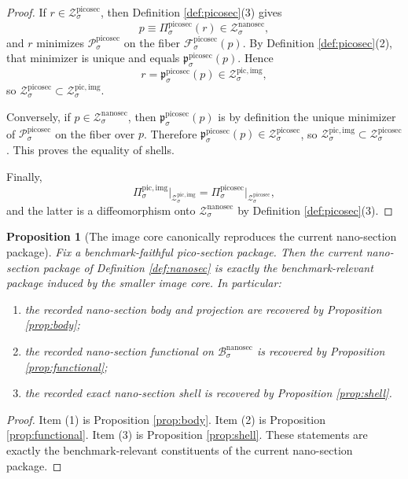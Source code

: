 \documentclass[11pt]{article}
\newcommand{\NanoSectionBody}[1]{\mathcal B_{#1}^{\mathrm{nanosec}}}
\newcommand{\NanoSectionShell}[1]{\mathcal Z_{#1}^{\mathrm{nanosec}}}
\newcommand{\PicoSectionProj}[1]{\Pi_{#1}^{\mathrm{picosec}}}
\newcommand{\PicoSectionFiber}[2]{\mathcal F_{#1}^{\mathrm{picosec}}(#2)}
\newcommand{\PicoSectionNanoMin}[1]{\mathfrak p_{#1}^{\mathrm{picosec}}}
\newcommand{\PicoSectionFunctional}[1]{\mathscr P_{#1}^{\mathrm{picosec}}}
\newcommand{\PicoSectionShell}[1]{\mathcal Z_{#1}^{\mathrm{picosec}}}
\newcommand{\PicoImgProj}[1]{\Pi_{#1}^{\mathrm{pic,img}}}
\newcommand{\PicoImgShell}[1]{\mathcal Z_{#1}^{\mathrm{pic,img}}}
\newtheorem{proposition}{Proposition}
\begin{document}
\begin{proof}
If \(r\in\PicoSectionShell{\sigma}\), then Definition \ref{def:picosec}(3) gives
\[
p\equiv \PicoSectionProj{\sigma}(r)\in\NanoSectionShell{\sigma},
\]
and \(r\) minimizes \(\PicoSectionFunctional{\sigma}\) on the fiber \(\PicoSectionFiber{\sigma}{p}\). By Definition \ref{def:picosec}(2), that minimizer is unique and equals \(\PicoSectionNanoMin{\sigma}(p)\). Hence
\[
r=\PicoSectionNanoMin{\sigma}(p)\in\PicoImgShell{\sigma},
\]
so \(\PicoSectionShell{\sigma}\subset\PicoImgShell{\sigma}\).

Conversely, if \(p\in\NanoSectionShell{\sigma}\), then \(\PicoSectionNanoMin{\sigma}(p)\) is by definition the unique minimizer of \(\PicoSectionFunctional{\sigma}\) on the fiber over \(p\). Therefore \(\PicoSectionNanoMin{\sigma}(p)\in\PicoSectionShell{\sigma}\), so \(\PicoImgShell{\sigma}\subset\PicoSectionShell{\sigma}\). This proves the equality of shells.

Finally,
\[
\PicoImgProj{\sigma}\big|_{\PicoImgShell{\sigma}}
=
\PicoSectionProj{\sigma}\big|_{\PicoSectionShell{\sigma}},
\]
and the latter is a diffeomorphism onto \(\NanoSectionShell{\sigma}\) by Definition \ref{def:picosec}(3).
\end{proof}

\begin{proposition}[The image core canonically reproduces the current nano-section package]
\label{prop:package}
Fix a benchmark-faithful pico-section package. Then the current nano-section package of Definition \ref{def:nanosec} is exactly the benchmark-relevant package induced by the smaller image core. In particular:
\begin{enumerate}
    \item the recorded nano-section body and projection are recovered by Proposition \ref{prop:body};
    \item the recorded nano-section functional on \(\NanoSectionBody{\sigma}\) is recovered by Proposition \ref{prop:functional};
    \item the recorded exact nano-section shell is recovered by Proposition \ref{prop:shell}.
\end{enumerate}
\end{proposition}

\begin{proof}
Item (1) is Proposition \ref{prop:body}. Item (2) is Proposition \ref{prop:functional}. Item (3) is Proposition \ref{prop:shell}. These statements are exactly the benchmark-relevant constituents of the current nano-section package.
\end{proof}
\end{document}
